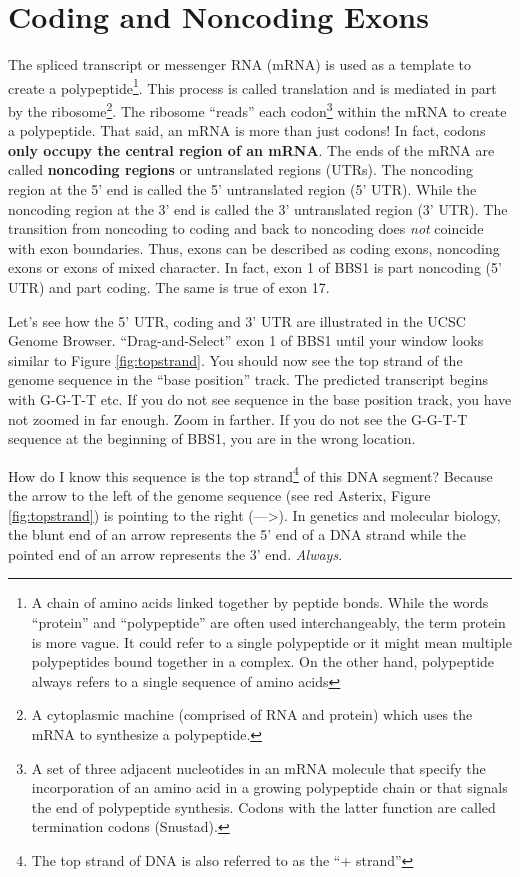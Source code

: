 \documentclass[
]{book}
\begin{document}
\hypertarget{coding-and-noncoding-exons}{%
\section{Coding and Noncoding Exons}\label{coding-and-noncoding-exons}}

The spliced transcript or messenger RNA (mRNA) is used as a template to create a polypeptide\footnote{A chain of amino acids linked together by peptide bonds. While the words ``protein'' and ``polypeptide'' are often used interchangeably, the term protein is more vague. It could refer to a single polypeptide or it might mean multiple polypeptides bound together in a complex. On the other hand, polypeptide always refers to a single sequence of amino acids}. This process is called translation and is mediated in part by the ribosome\footnote{A cytoplasmic machine (comprised of RNA and protein) which uses the mRNA to synthesize a polypeptide.}. The ribosome ``reads'' each codon\footnote{A set of three adjacent nucleotides in an mRNA molecule that specify the incorporation of an amino acid in a growing polypeptide chain or that signals the end of polypeptide synthesis. Codons with the latter function are called termination codons (Snustad).} within the mRNA to create a polypeptide. That said, an mRNA is more than just codons! In fact, codons \textbf{only occupy the central region of an mRNA}. The ends of the mRNA are called \textbf{noncoding regions} or untranslated regions (UTRs). The noncoding region at the 5' end is called the 5' untranslated region (5' UTR). While the noncoding region at the 3' end is called the 3' untranslated region (3' UTR). The transition from noncoding to coding and back to noncoding does \emph{not} coincide with exon boundaries. Thus, exons can be described as coding exons, noncoding exons or exons of mixed character. In fact, exon 1 of BBS1 is part noncoding (5' UTR) and part coding. The same is true of exon 17.

Let's see how the 5' UTR, coding and 3' UTR are illustrated in the UCSC Genome Browser. ``Drag-and-Select'' exon 1 of BBS1 until your window looks similar to Figure \ref{fig:topstrand}. You should now see the top strand of the genome sequence in the ``base position'' track. The predicted transcript begins with G-G-T-T etc. If you do not see sequence in the base position track, you have not zoomed in far enough. Zoom in farther. If you do not see the G-G-T-T sequence at the beginning of BBS1, you are in the wrong location.

How do I know this sequence is the top strand\footnote{The top strand of DNA is also referred to as the ``+ strand''} of this DNA segment? Because the arrow to the left of the genome sequence (see red Asterix, Figure \ref{fig:topstrand}) is pointing to the right (---\textgreater). In genetics and molecular biology, the blunt end of an arrow represents the 5' end of a DNA strand while the pointed end of an arrow represents the 3' end. \emph{Always}.
\end{document}
